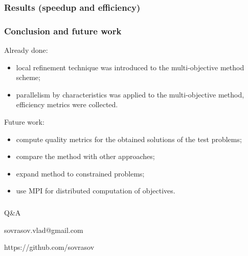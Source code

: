 \documentclass[aspectratio=1610]{beamer}
\begin{document}
\begin{frame}
  \frametitle{Results (speedup and efficiency)}
  \begin{figure}[ht]
      \centering
  \end{figure}
\end{frame}

\begin{frame}
  \frametitle{Conclusion and future work}
    Already done:
    \begin{itemize}
      \item local refinement technique was introduced to the multi-objective method scheme;
      \item parallelism by characteristics was applied to the multi-objective method, efficiency metrics were collected.
    \end{itemize}
    Future work:
    \begin{itemize}
      \item compute quality metrics for the obtained solutions of the test problems;
      \item compare the method with other approaches;
      \item expand method to constrained problems;
      \item use MPI for distributed computation of objectives.
    \end{itemize}
\end{frame}

\begin{frame}{{}}
  \frametitle{ }
  \begin{center}
    \Large{Q\&A}

\vspace{1cm}

    sovrasov.vlad@gmail.com

    https://github.com/sovrasov
  \end{center}
\end{frame}
\end{document}

